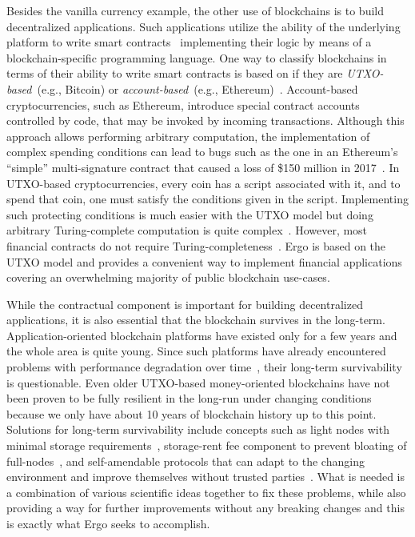 Besides the vanilla currency example, the other use of blockchains is to build decentralized applications.
Such applications utilize the ability of the underlying platform to write smart contracts~\cite{szabo1994smart} implementing their logic by means of a blockchain-specific programming language.
One way to classify blockchains in terms of their ability to write smart contracts is based on if they are  
{\em UTXO-based}~(e.g., Bitcoin) or {\em account-based}~(e.g., Ethereum)~\cite{zahnentferner2018chimeric}.
Account-based cryptocurrencies, such as Ethereum, introduce special contract accounts controlled by code,
that may be invoked by incoming transactions.
Although this approach allows performing arbitrary computation, the implementation of complex spending conditions
can lead to bugs such as the one in an Ethereum's ``simple'' multi-signature contract that caused a loss of \$150 million in 2017~\cite{parityLock}.
In UTXO-based cryptocurrencies, every coin has a script associated with it, and to spend that coin, one must satisfy the conditions given in the script.
Implementing such protecting conditions is much easier with the UTXO model but doing arbitrary Turing-complete computation is quite complex~\cite{chepurnoy2018self}.
However, most financial contracts do not require Turing-completeness~\cite{jansenDo}.
Ergo is based on the UTXO model and provides a convenient way to implement financial applications covering an
overwhelming majority of public blockchain use-cases.

While the contractual component is important for building decentralized applications,
it is also essential that the blockchain survives in the long-term.
Application-oriented blockchain platforms have existed only for a few years and the whole area is quite young. Since such platforms have already encountered problems with performance degradation over time~\cite{???}, their long-term survivability is questionable.
Even older UTXO-based money-oriented blockchains have not been proven to be fully resilient in the long-run
under changing conditions because we only have about 10 years of blockchain history up to this point.
Solutions for long-term survivability include concepts 
such as light nodes with minimal storage requirements~\cite{reyzin2017improving},
storage-rent fee component to prevent bloating of full-nodes~\cite{chepurnoy2018systematic}, and 
self-amendable protocols that can adapt to the changing environment and improve themselves without
trusted parties~\cite{goodman2014tezos}.
What is needed is a combination of various scientific ideas together to fix these problems, while also
providing a way for further improvements without any breaking changes and this is exactly what Ergo seeks to accomplish.
